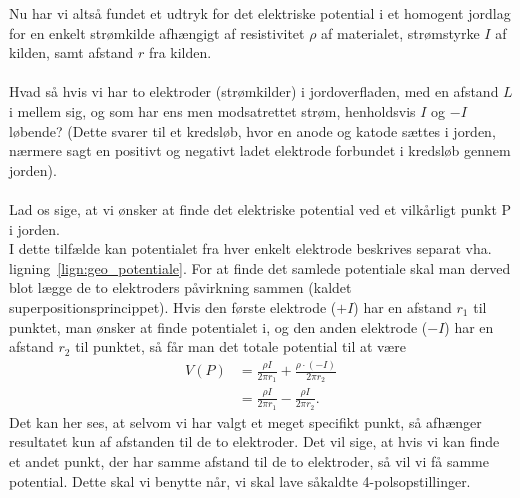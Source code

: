 %
Nu har vi altså fundet et udtryk for det elektriske potential i et homogent jordlag for en enkelt strømkilde afhængigt af resistivitet $\rho$ af materialet, strømstyrke $I$ af kilden, samt afstand $r$ fra kilden. \\ \\
%
%
Hvad så hvis vi har to elektroder (strømkilder) i jordoverfladen, med en afstand $L$ i mellem sig, og som har ens men modsatrettet strøm, henholdsvis $I$ og $-I$ løbende? (Dette svarer til et kredsløb, hvor en anode og katode sættes i jorden, nærmere sagt en positivt og negativt ladet elektrode forbundet i kredsløb gennem jorden). \\ \\
%
%
Lad os sige, at vi ønsker at finde det elektriske potential ved et vilkårligt punkt P i jorden. \\
%
I dette tilfælde kan potentialet fra hver enkelt elektrode beskrives separat vha. ligning~\eqref{lign:geo_potentiale}. For at finde det samlede potentiale skal man derved blot lægge de to elektroders påvirkning sammen (kaldet superpositionsprincippet). Hvis den første elektrode ($+I$) har en afstand $r_1$ til punktet, man ønsker at finde potentialet i, og den anden elektrode ($-I$) har en afstand $r_2$ til punktet, så får man det totale potential til at være
\begin{align}\label{eq:geo_Vdipol}
    V(P) &= \frac{\rho I}{2\pi r_1} + \frac{\rho \cdot (-I)}{2\pi r_2} \\
        &= \frac{\rho I}{2\pi r_1} - \frac{\rho I}{2\pi r_2}.\label{eq:geo_Jr}
\end{align}
Det kan her ses, at selvom vi har valgt et meget specifikt punkt, så afhænger resultatet kun af afstanden til de to elektroder. Det vil sige, at hvis vi kan finde et andet punkt, der har samme afstand til de to elektroder, så vil vi få samme potential. Dette skal vi benytte når, vi skal lave såkaldte 4-polsopstillinger.
%
%
